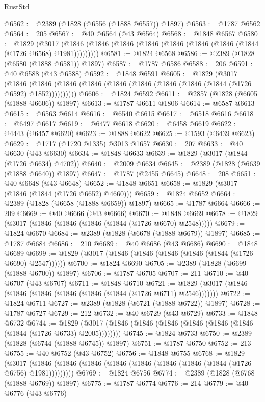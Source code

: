 \begin{lexlean}{RustStd}
\begin{coremodule}
@6562 := @2389 (@1828 (@6556 (@1888 @6557)) @1897)
@6563 := @1787 @6562
@6564 := 205
@6567 := @40 @6564 (@43 @6564)
@6568 := @1848 @6567
@6580 := @1829
    (@3017 (@1846 (@1846 (@1846 (@1846 (@1846 (@1846 (@1846 (@1844 (@1726 @6568) @1981)))))))))
@6581 := @1824 @6568
@6586 := @2389 (@1828 (@6580 (@1888 @6581)) @1897)
@6587 := @1787 @6586
@6588 := 206
@6591 := @40 @6588 (@43 @6588)
@6592 := @1848 @6591
@6605 := @1829
    (@3017
      (@1846 (@1846 (@1846 (@1846 (@1846 (@1846 (@1846 (@1846 (@1844 (@1726 @6592) @1852))))))))))
@6606 := @1824 @6592
@6611 := @2857 (@1828 (@6605 (@1888 @6606)) @1897)
@6613 := @1787 @6611 @1806
@6614 := @6587 @6613
@6615 := @6563 @6614
@6616 := @6540 @6615
@6617 := @6518 @6616
@6618 := @6497 @6617
@6619 := @6477 @6618
@6620 := @6458 @6619
@6622 := @4443 (@6457 @6620)
@6623 := @1888 @6622
@6625 := @1593 (@6439 @6623)
@6629 := @1717 (@1720 @1335) @3013 @1657
@6630 := 207
@6633 := @40 @6630 (@43 @6630)
@6634 := @1848 @6633
@6639 := @1829 (@3017 (@1844 (@1726 @6634) @4702))
@6640 := @2009 @6634
@6645 := @2389 (@1828 (@6639 (@1888 @6640)) @1897)
@6647 := @1787 (@2455 @6645)
@6648 := 208
@6651 := @40 @6648 (@43 @6648)
@6652 := @1848 @6651
@6658 := @1829 (@3017 (@1846 (@1844 (@1726 @6652) @4660)))
@6659 := @1824 @6652
@6664 := @2389 (@1828 (@6658 (@1888 @6659)) @1897)
@6665 := @1787 @6664
@6666 := 209
@6669 := @40 @6666 (@43 @6666)
@6670 := @1848 @6669
@6678 := @1829 (@3017 (@1846 (@1846 (@1846 (@1844 (@1726 @6670) @2548)))))
@6679 := @1824 @6670
@6684 := @2389 (@1828 (@6678 (@1888 @6679)) @1897)
@6685 := @1787 @6684
@6686 := 210
@6689 := @40 @6686 (@43 @6686)
@6690 := @1848 @6689
@6699 := @1829 (@3017 (@1846 (@1846 (@1846 (@1846 (@1844 (@1726 @6690) @2547))))))
@6700 := @1824 @6690
@6705 := @2389 (@1828 (@6699 (@1888 @6700)) @1897)
@6706 := @1787 @6705
@6707 := 211
@6710 := @40 @6707 (@43 @6707)
@6711 := @1848 @6710
@6721 := @1829 (@3017 (@1846 (@1846 (@1846 (@1846 (@1846 (@1844 (@1726 @6711) @2546)))))))
@6722 := @1824 @6711
@6727 := @2389 (@1828 (@6721 (@1888 @6722)) @1897)
@6728 := @1787 @6727
@6729 := 212
@6732 := @40 @6729 (@43 @6729)
@6733 := @1848 @6732
@6744 := @1829 (@3017 (@1846 (@1846 (@1846 (@1846 (@1846 (@1846 (@1844 (@1726 @6733) @2005))))))))
@6745 := @1824 @6733
@6750 := @2389 (@1828 (@6744 (@1888 @6745)) @1897)
@6751 := @1787 @6750
@6752 := 213
@6755 := @40 @6752 (@43 @6752)
@6756 := @1848 @6755
@6768 := @1829
    (@3017 (@1846 (@1846 (@1846 (@1846 (@1846 (@1846 (@1846 (@1844 (@1726 @6756) @1981)))))))))
@6769 := @1824 @6756
@6774 := @2389 (@1828 (@6768 (@1888 @6769)) @1897)
@6775 := @1787 @6774
@6776 := 214
@6779 := @40 @6776 (@43 @6776)

\end{coremodule}
\end{lexlean}
